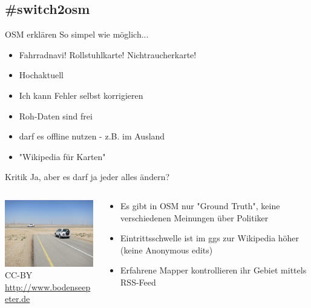 \documentclass{beamer}
\begin{document}
\subsection{\#switch2osm}

\begin{frame}{OSM erklären}
	So simpel wie möglich...
	\begin{itemize}
		\item Fahrradnavi! Rollstuhlkarte! Nichtraucherkarte!
		\item Hochaktuell
		\item Ich kann Fehler selbst korrigieren
		\item Roh-Daten sind frei
		\item darf es offline nutzen - z.B. im Ausland
		\item "Wikipedia für Karten"
	\end{itemize}
	
\end{frame}

\begin{frame}{Kritik}
	Ja, aber es darf ja jeder alles ändern?
	\vspace{5mm}
	\begin{columns}[c]
		\begin{column}[T]{.4\textwidth}
			\includegraphics[width=4.5cm]{unconnected.jpg} \\
			{\TINY CC-BY \url{http://www.bodenseepeter.de}}
		\end{column}
		\pause
		\begin{column}[T]{.6\textwidth}
			\begin{itemize}
				\item Es gibt in OSM nur "Ground Truth", keine verschiedenen Meinungen über Politiker 
				\item Eintrittsschwelle ist im ggs zur Wikipedia höher (keine Anonymous edits)
				\item Erfahrene Mapper kontrollieren ihr Gebiet mittels RSS-Feed
			\end{itemize}
		\end{column}
	\end{columns}
\end{frame}
\end{document}
